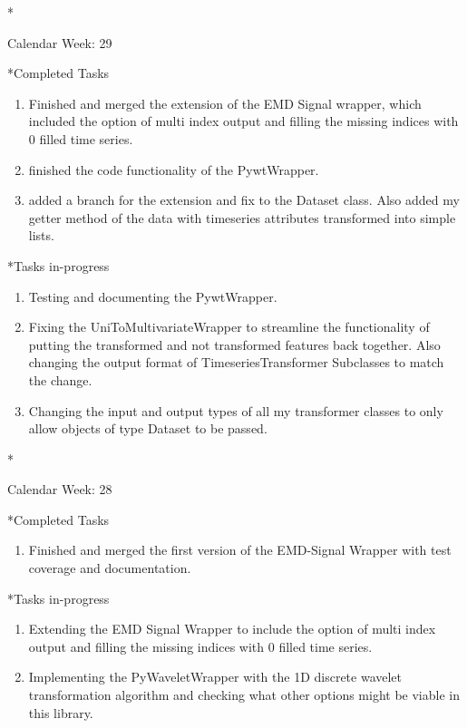 \documentclass[11pt,a4paper]{article}
\begin{document}
\newpage
\begin{section}*{Calendar Week: 29 \hfill \date{23 July, 2021}}
	
	\begin{subsection}*{Completed Tasks}
		\begin{enumerate}
			\item Finished and merged the extension of the EMD Signal wrapper, which included the option of multi index output and filling the missing indices with 0 filled time series.
			\item finished the code functionality of the PywtWrapper.
			\item added a branch for the extension and fix to the Dataset class. Also added my getter method of the data with timeseries attributes transformed into simple lists.
		\end{enumerate}
	\end{subsection}
	
	\begin{subsection}*{Tasks in-progress}
		\begin{enumerate}
			\item Testing and documenting the PywtWrapper.
			\item Fixing the UniToMultivariateWrapper to streamline the functionality of putting the transformed and not transformed features back together. Also changing the output format of TimeseriesTransformer Subclasses to match the change.
			\item Changing the input and output types of all my transformer classes to only allow objects of type Dataset to be passed.
		\end{enumerate}
	\end{subsection}
	
\end{section}

\newpage
\begin{section}*{Calendar Week: 28 \hfill \date{16 July, 2021}}
	
	\begin{subsection}*{Completed Tasks}
		\begin{enumerate}
			\item Finished and merged the first version of the EMD-Signal Wrapper with test coverage and documentation.
		\end{enumerate}
	\end{subsection}
	
	\begin{subsection}*{Tasks in-progress}
		\begin{enumerate}
			\item Extending the EMD Signal Wrapper to include the option of multi index output and filling the missing indices with 0 filled time series.
			\item Implementing the PyWaveletWrapper with the 1D discrete wavelet transformation algorithm and checking what other options might be viable in this library.
		\end{enumerate}
	\end{subsection}
	
\end{section}
\end{document}
